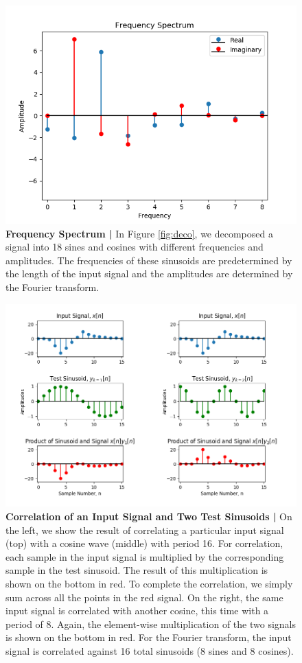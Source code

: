 \documentclass[12pt,a4paper]{article}
\begin{document}
\begin{figure}
\centering
\includegraphics[width=.85\textwidth]{_images/FreqSpec.png}
\caption{\textbf{Frequency Spectrum |} In Figure \ref{fig:deco}, we decomposed a signal into 18 sines and cosines with different frequencies and amplitudes. The frequencies of these sinusoids are predetermined by the length of the input signal and the amplitudes are determined by the Fourier transform. 
}
\end{figure}


\begin{figure}
\centering
\includegraphics[width=\textwidth]{_images/FourierCorrelation3-m56p3-47p1.png}
\caption{\textbf{Correlation of an Input Signal and Two Test Sinusoids |} On the left, we show the result of correlating a particular input signal (top) with a cosine wave (middle) with period 16. For correlation, each sample in the input signal is multiplied by the corresponding sample in the test sinusoid. The result of this multiplication is shown on the bottom in red. To complete the correlation, we simply sum across all the points in the red signal. On the right, the same input signal is correlated with another cosine, this time with a period of 8. Again, the element-wise multiplication of the two signals is shown on the bottom in red. For the Fourier transform, the input signal is correlated against 16 total sinusoids (8 sines and 8 cosines).}
\end{figure}
\end{document}
